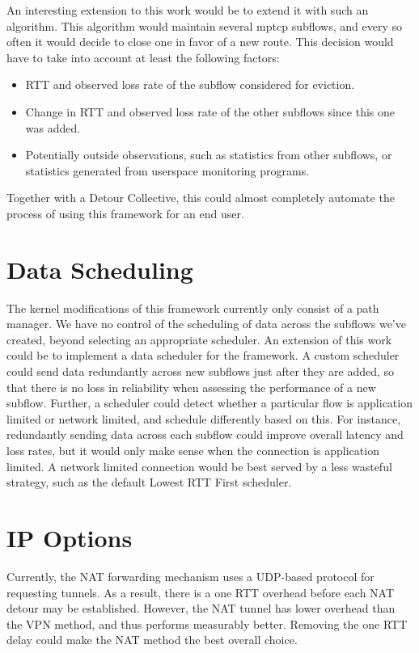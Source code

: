 \documentclass{cwru}
\begin{document}
An interesting extension to this work would be to extend it with such an
algorithm. This algorithm would maintain several \ac{mptcp} subflows, and every
so often it would decide to close one in favor of a new route. This decision
would have to take into account at least the following factors:

\begin{itemize}
\item RTT and observed loss rate of the subflow considered for eviction.
\item Change in RTT and observed loss rate of the other subflows since this one
  was added.
\item Potentially outside observations, such as statistics from other subflows,
  or statistics generated from userspace monitoring programs.
\end{itemize}

Together with a Detour Collective, this could almost completely automate the
process of using this framework for an end user.

\section{Data Scheduling}

The kernel modifications of this framework currently only consist of a path
manager. We have no control of the scheduling of data across the subflows we've
created, beyond selecting an appropriate scheduler. An extension of this work
could be to implement a data scheduler for the framework. A custom scheduler
could send data redundantly across new subflows just after they are added, so
that there is no loss in reliability when assessing the performance of a new
subflow. Further, a scheduler could detect whether a particular flow is
application limited or network limited, and schedule differently based on this.
For instance, redundantly sending data across each subflow could improve overall
latency and loss rates, but it would only make sense when the connection is
application limited. A network limited connection would be best served by a less
wasteful strategy, such as the default Lowest RTT First scheduler.

\section{IP Options}

Currently, the NAT forwarding mechanism uses a UDP-based protocol for requesting
tunnels. As a result, there is a one RTT overhead before each NAT detour may be
established. However, the NAT tunnel has lower overhead than the VPN method, and
thus performs measurably better. Removing the one RTT delay could make the NAT
method the best overall choice.
\end{document}
